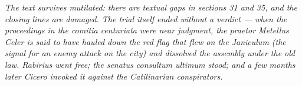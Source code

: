 \textit{The text survives mutilated: there are textual gaps in
sections 31 and 35, and the closing lines are damaged. The
trial itself ended without a verdict --- when the proceedings
in the comitia centuriata were near judgment, the praetor
Metellus Celer is said to have hauled down the red flag that
flew on the Janiculum (the signal for an enemy attack on the
city) and dissolved the assembly under the old law. Rabirius
went free; the senatus consultum ultimum stood; and a few
months later Cicero invoked it against the Catilinarian
conspirators.}

